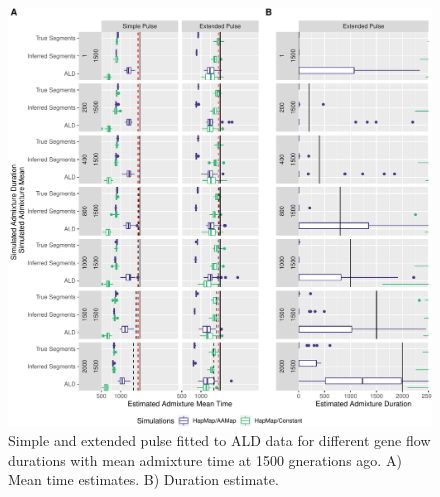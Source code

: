 \documentclass[11pt]{article}
\begin{document}
\begin{figure}
\centering
\includegraphics{ATE_Revisions_files/figure-latex/figResult2_1_Supplement-1.pdf}
\caption{\label{fig:figResult3_1_Supplement} Simple and extended pulse fitted to ALD data for different gene flow durations with mean admixture time at 1500 gnerations ago. A) Mean time estimates. B) Duration estimate.}
\end{figure}
\end{document}
